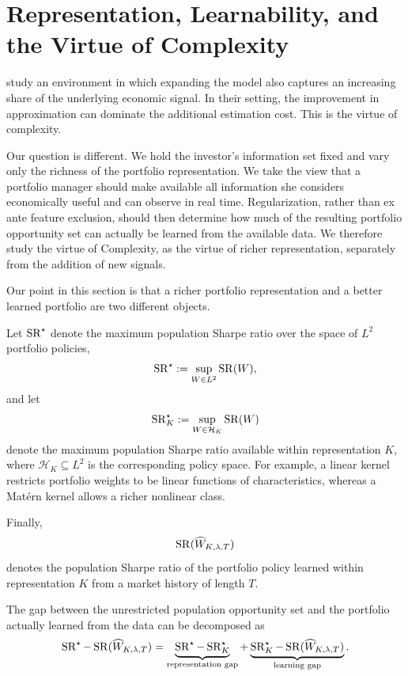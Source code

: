 \section{Representation, Learnability, and the Virtue of Complexity}
\label{sec:representation_learnability}
\citet{kellymalamudzhou2024} study an environment in which expanding the model
also captures an increasing share of the underlying economic signal. In their
setting, the improvement in approximation can dominate the additional
estimation cost. This is the virtue of complexity.

Our question is different. We hold the investor's information set fixed and
vary only the richness of the portfolio representation. We take the view that
a portfolio manager should make available all information she considers
economically useful and can observe in real time. Regularization, rather than
ex ante feature exclusion, should then determine how much of the resulting
portfolio opportunity set can actually be learned from the available data.
We therefore study the virtue of Complexity, as the virtue of richer representation, separately from the
addition of new signals.


Our point in this section is that a richer portfolio representation and a
better learned portfolio are two different objects.

Let $\operatorname{SR}^\star$ denote the maximum population Sharpe ratio over the space of
$L^2$ portfolio policies,
\[
\operatorname{SR}^\star := \sup_{W\in L^2}\operatorname{SR}(W),
\]
and let
\[
\operatorname{SR}_K^\star := \sup_{W\in\mathcal H_K}\operatorname{SR}(W)
\]
denote the maximum population Sharpe ratio available within representation
$K$, where $\mathcal H_K\subseteq L^2$ is the corresponding policy space.
For example, a linear kernel restricts portfolio weights to be linear
functions of characteristics, whereas a Matérn kernel allows a richer
nonlinear class.

Finally,
\[
\operatorname{SR}(\widehat W_{K,\lambda,T})
\]
denotes the population Sharpe ratio of the portfolio policy learned within
representation $K$ from a market history of length $T$.

The gap between the unrestricted population opportunity set and the portfolio
actually learned from the data can be decomposed as
\begin{equation}
\operatorname{SR}^\star-\operatorname{SR}(\widehat W_{K,\lambda,T})
=
\underbrace{\operatorname{SR}^\star-\operatorname{SR}_K^\star}_{\text{representation gap}}
+
\underbrace{
\operatorname{SR}_K^\star-\operatorname{SR}(\widehat W_{K,\lambda,T})
}_{\text{learning gap}}.
\label{eq:representation_estimation_decomposition}
\end{equation}

